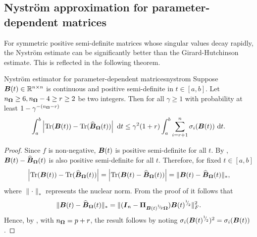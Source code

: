 \documentclass[12pt]{article}
\begin{document}
\subsection{Nyström approximation for parameter-dependent matrices}
\label{subsec:nystrom}

For symmetric positive semi-definite matrices whose singular values decay rapidly, the Nyström estimate  can be significantly better than the Girard-Hutchinson estimate. This is reflected in the following theorem.

\begin{theorem}{Nyström estimator for parameter-dependent matrices}{nystrom}
    Suppose $\boldsymbol{B}(t) \in \mathbb{R}^{n \times n}$ is continuous and positive semi-definite in $t \in [a, b]$. Let $n_{\boldsymbol{\Omega}} \geq 6, n_{\boldsymbol{\Omega}} - 4 \geq r \geq 2$ be two integers. Then for all $\gamma \geq 1$ with probability at least $1 - \gamma^{-(n_{\boldsymbol{\Omega}} - r)}$
    \begin{equation}
        \int_{a}^{b} \left| \operatorname{Tr}(\boldsymbol{B}(t)) - \operatorname{Tr}(\widehat{\boldsymbol{B}}_{\boldsymbol{\Omega}}(t)) \right| ~\mathrm{d}t
        \leq \gamma^2 (1 + r) \int_{a}^{b} \sum_{i = r+1}^{n} \sigma_i(\boldsymbol{B}(t)) ~\mathrm{d}t.
    \end{equation}
\end{theorem}

\begin{proof}
    Since $f$ is non-negative, $\boldsymbol{B}(t)$ is positive semi-definite for all $t$. By \cite[lemma 2.1]{frangella-2023-randomized-nystrom}, $\boldsymbol{B}(t) - \widehat{\boldsymbol{B}}_{\boldsymbol{\Omega}}(t)$ is also positive semi-definite for all $t$. Therefore, for fixed $t \in [a, b]$
    \begin{equation}
        \left| \operatorname{Tr}(\boldsymbol{B}(t)) - \operatorname{Tr}(\widehat{\boldsymbol{B}}_{\boldsymbol{\Omega}}(t)) \right|
        = \left| \operatorname{Tr}(\boldsymbol{B}(t) - \widehat{\boldsymbol{B}}_{\boldsymbol{\Omega}}(t)) \right|
        = \lVert \boldsymbol{B}(t) - \widehat{\boldsymbol{B}}_{\boldsymbol{\Omega}}(t) \rVert _{\ast},
    \end{equation}
    where $\lVert \cdot \rVert _{\ast}$ represents the nuclear norm.  From the proof of \cite[corollary 8.2]{tropp-2023-randomized-algorithms} it follows that
    \begin{equation}
        \lVert \boldsymbol{B}(t) - \widehat{\boldsymbol{B}}_{\boldsymbol{\Omega}}(t) \rVert _{\ast} = \lVert (\boldsymbol{I}_n - \boldsymbol{\Pi}_{\boldsymbol{B}(t)^{{}^{1}{\mskip -5mu/\mskip -3mu}_{2}} \boldsymbol{\Omega}}) \boldsymbol{B}(t)^{{}^{1}{\mskip -5mu/\mskip -3mu}_{2}} \rVert _F^2.
    \end{equation}
    Hence, by \cite[theorem 9]{kressner-2023-randomized-lowrank}, with $n_{\boldsymbol{\Omega}} = p + r$, the result follows by noting $\sigma_i(\boldsymbol{B}(t)^{{}^{1}{\mskip -5mu/\mskip -3mu}_{2}})^{2} = \sigma_i(\boldsymbol{B}(t))$.
\end{proof}
\end{document}
